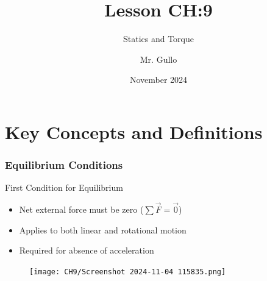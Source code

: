 \documentclass{beamer}
\title{Lesson CH:9}
\subtitle{Statics and Torque}
\author{Mr. Gullo}
\date{November 2024}
\begin{document}
\frame{\titlepage}

\section{Key Concepts and Definitions}
\begin{frame}
\frametitle{Equilibrium Conditions}

\begin{block}{First Condition for Equilibrium}
\begin{itemize}
    \item Net external force must be zero ($\sum \vec{F} = \vec{0}$)
    \item Applies to both linear and rotational motion
    \item Required for absence of acceleration
\end{itemize}
\end{block}

\begin{figure}
    \centering
    \texttt{[image: CH9/Screenshot 2024-11-04 115835.png]}
\end{figure}
\end{frame}
\end{document}
